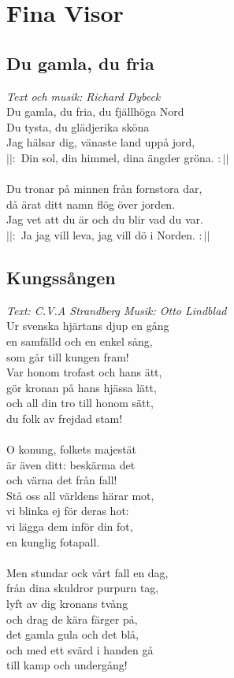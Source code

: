 \chapter{Fina Visor}
\section{Du gamla, du fria}
\textit{Text och musik: Richard Dybeck}
\vspace{2mm}\\
Du gamla, du fria, du fjällhöga Nord\\
Du tysta, du glädjerika sköna\\
Jag hälsar dig, vänaste land uppå jord,\\
$||:$ Din sol, din himmel, dina ängder gröna. $:||$\\
\\
Du tronar på minnen från fornstora dar,\\
då ärat ditt namn flög över jorden.\\
Jag vet att du är och du blir vad du var.\\
$||:$ Ja jag vill leva, jag vill dö i Norden. $:||$\\

\section{Kungssången}
\textit{Text: C.V.A Strandberg \hspace{5mm} Musik: Otto Lindblad}
\vspace{2mm}\\
Ur svenska hjärtans djup en gång \\
en samfälld och en enkel sång,\\
som går till kungen fram!\\
Var honom trofast och hans ätt,\\
gör kronan på hans hjässa lätt,\\
och all din tro till honom sätt,\\
du folk av frejdad stam!\\
\\
O konung, folkets majestät\\
är även ditt: beskärma det\\
och värna det från fall!\\
Stå oss all världens härar mot,\\
vi blinka ej för deras hot:\\
vi lägga dem inför din fot,\\
en kunglig fotapall.\\
\\
Men stundar ock vårt fall en dag,\\
från dina skuldror purpurn tag,\\
lyft av dig kronans tvång\\
och drag de kära färger på,\\
det gamla gula och det blå,\\
och med ett svärd i handen gå\\
till kamp och undergång!\\

